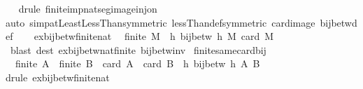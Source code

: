 \begin{isabellebody}
%
\isadelimproof
\ \ %
\endisadelimproof
%
\isatagproof
{}\isamarkupfalse%
{\isacharparenleft}{\kern0pt}drule\ finite{\isacharunderscore}{\kern0pt}imp{\isacharunderscore}{\kern0pt}nat{\isacharunderscore}{\kern0pt}seg{\isacharunderscore}{\kern0pt}image{\isacharunderscore}{\kern0pt}inj{\isacharunderscore}{\kern0pt}on{\isacharparenright}{\kern0pt}\isanewline
\ \ \isamarkupfalse%
{\isacharparenleft}{\kern0pt}auto\ simp{\isacharcolon}{\kern0pt}atLeast{}LessThan{\isacharbrackleft}{\kern0pt}symmetric{\isacharbrackright}{\kern0pt}\ lessThan{\isacharunderscore}{\kern0pt}def{\isacharbrackleft}{\kern0pt}symmetric{\isacharbrackright}{\kern0pt}\ card{\isacharunderscore}{\kern0pt}image\ bij{\isacharunderscore}{\kern0pt}betw{\isacharunderscore}{\kern0pt}def{\isacharparenright}{\kern0pt}\isanewline
\ \ \isamarkupfalse%
%
\endisatagproof
{\isafoldproof}%
%
\isadelimproof
\isanewline
%
\endisadelimproof
\isanewline
{}\isamarkupfalse%
\ ex{\isacharunderscore}{\kern0pt}bij{\isacharunderscore}{\kern0pt}betw{\isacharunderscore}{\kern0pt}finite{\isacharunderscore}{\kern0pt}nat{\isacharcolon}{\kern0pt}\isanewline
\ \ {\isachardoublequoteopen}finite\ M\ {\isasymLongrightarrow}\ {\isasymexists}h{\isachardot}{\kern0pt}\ bij{\isacharunderscore}{\kern0pt}betw\ h\ M\ {\isacharbraceleft}{\kern0pt}{}{\isachardot}{\kern0pt}{\isachardot}{\kern0pt}{\isacharless}{\kern0pt}card\ M{\isacharbraceright}{\kern0pt}{\isachardoublequoteclose}\isanewline
%
\isadelimproof
\ \ %
\endisadelimproof
%
\isatagproof
{}\isamarkupfalse%
\ {\isacharparenleft}{\kern0pt}blast\ dest{\isacharcolon}{\kern0pt}\ ex{\isacharunderscore}{\kern0pt}bij{\isacharunderscore}{\kern0pt}betw{\isacharunderscore}{\kern0pt}nat{\isacharunderscore}{\kern0pt}finite\ bij{\isacharunderscore}{\kern0pt}betw{\isacharunderscore}{\kern0pt}inv{\isacharparenright}{\kern0pt}%
\endisatagproof
{\isafoldproof}%
%
\isadelimproof
\isanewline
%
\endisadelimproof
\isanewline
{}\isamarkupfalse%
\ finite{\isacharunderscore}{\kern0pt}same{\isacharunderscore}{\kern0pt}card{\isacharunderscore}{\kern0pt}bij{\isacharcolon}{\kern0pt}\isanewline
\ \ {\isachardoublequoteopen}finite\ A\ {\isasymLongrightarrow}\ finite\ B\ {\isasymLongrightarrow}\ card\ A\ {\isacharequal}{\kern0pt}\ card\ B\ {\isasymLongrightarrow}\ {\isasymexists}h{\isachardot}{\kern0pt}\ bij{\isacharunderscore}{\kern0pt}betw\ h\ A\ B{\isachardoublequoteclose}\isanewline
%
\isadelimproof
\ \ %
\endisadelimproof
%
\isatagproof
{}\isamarkupfalse%
{\isacharparenleft}{\kern0pt}drule\ ex{\isacharunderscore}{\kern0pt}bij{\isacharunderscore}{\kern0pt}betw{\isacharunderscore}{\kern0pt}finite{\isacharunderscore}{\kern0pt}nat{\isacharparenright}{\kern0pt}\isanewline

\end{isabellebody}
